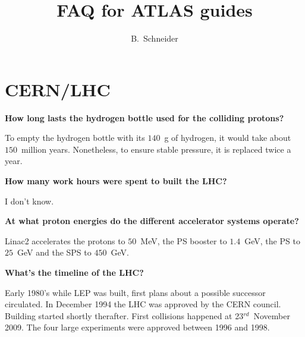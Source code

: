 \documentclass{atlasnote}
\title{FAQ for ATLAS guides}
\author[1]{B.~Schneider}
\affil[1]{TRIUMF}
\newenvironment{question} %
{\noindent\bfseries}
{\par}
\newenvironment{answer} %
{}
{\vspace*{10pt}}
\newenvironment{faq} %
{\par\noindent\begin{minipage}{\linewidth}}
    {\end{minipage}\par}
\begin{document}
\section{CERN/LHC}

\begin{faq}
    \begin{question}
        How long lasts the hydrogen bottle used for the colliding protons?
    \end{question}
    \begin{answer}
        To empty the hydrogen bottle with its $140$~g of hydrogen, it would take about $150$~million years. Nonetheless, to ensure stable pressure, it is
        replaced twice a year.
    \end{answer}
\end{faq}

\begin{faq}
    \begin{question}
        How many work hours were spent to built the LHC?
    \end{question}
    \begin{answer}
        I don't know.
    \end{answer}
\end{faq}

\begin{faq}
    \begin{question}
        At what proton energies do the different accelerator systems operate?
    \end{question}
    \begin{answer}
        Linac2 accelerates the protons to $50$~MeV, the PS booster to $1.4$~GeV, the PS to $25$~GeV and the SPS to $450$~GeV. 
    \end{answer}
\end{faq}

\begin{faq}
    \begin{question}
        What's the timeline of the LHC?
    \end{question}
    \begin{answer}
        Early 1980's while LEP was built, first plans about a possible successor circulated. In December 1994 the LHC was approved by the CERN
        council. Building started shortly therafter. First collisions happened at 23$^{rd}$~November 2009. The four large experiments were approved between 1996
        and 1998. 
    \end{answer}
\end{faq}
\end{document}
